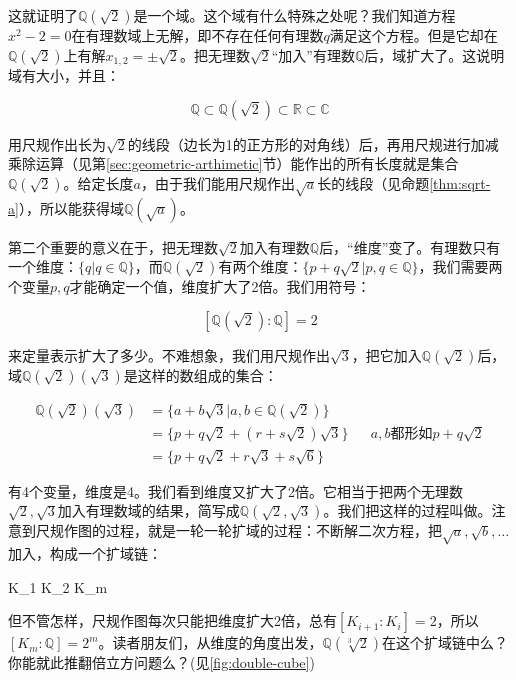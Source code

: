 这就证明了$\mathbb{Q}(\sqrt{2})$是一个域。这个域有什么特殊之处呢？我们知道方程$x^2 - 2 = 0$在有理数域上无解，即不存在任何有理数$q$满足这个方程。但是它却在$\mathbb{Q}(\sqrt{2})$上有解$x_{1, 2} = \pm \sqrt{2}$。把无理数$\sqrt{2}$“加入”有理数$\mathbb{Q}$后，域扩大了。这说明域有大小，并且：

\[
\mathbb{Q} \subset \mathbb{Q}(\sqrt{2}) \subset \mathbb{R} \subset \mathbb{C}
\]

用尺规作出长为$\sqrt{2}$的线段（边长为1的正方形的对角线）后，再用尺规进行加减乘除运算（见第\ref{sec:geometric-arthimetic}节）能作出的所有长度就是集合$\mathbb{Q}(\sqrt{2})$。给定长度$a$，由于我们能用尺规作出$\sqrt{a}$长的线段（见命题\ref{thm:sqrt-a}），所以能获得域$\mathbb{Q}(\sqrt{a})$。

第二个重要的意义在于，把无理数$\sqrt{2}$加入有理数$\mathbb{Q}$后，“维度”变了。有理数只有一个维度：$\{q | q \in \mathbb{Q}\}$，而$\mathbb{Q}(\sqrt{2})$有两个维度：$\{p + q \sqrt{2} | p, q \in \mathbb{Q}\}$，我们需要两个变量$p, q$才能确定一个值，维度扩大了2倍。我们用符号：

\[
[\mathbb{Q}(\sqrt{2}) : \mathbb{Q}] = 2
\]

来定量表示扩大了多少。不难想象，我们用尺规作出$\sqrt{3}$，把它加入$\mathbb{Q}(\sqrt{2})$后，域$\mathbb{Q}(\sqrt{2})(\sqrt{3})$是这样的数组成的集合：

\begin{align*}
  \mathbb{Q}(\sqrt{2})(\sqrt{3}) &= \{a + b \sqrt{3} | a, b \in \mathbb{Q}(\sqrt{2}) \} \\
  &= \{p + q \sqrt{2} + (r + s\sqrt{2})\sqrt{3} \} && a, b \text{都形如} p + q\sqrt{2} \\
  &= \{p + q \sqrt{2} + r\sqrt{3} + s\sqrt{6} \}
\end{align*}

有4个变量，维度是4。我们看到维度又扩大了2倍。它相当于把两个无理数$\sqrt{2}, \sqrt{3}$加入有理数域的结果，简写成$\mathbb{Q}(\sqrt{2}, \sqrt{3})$。我们把这样的过程叫做。注意到尺规作图的过程，就是一轮一轮扩域的过程：不断解二次方程，把$\sqrt{a}, \sqrt{b}, \dotsc$加入，构成一个扩域链：

\be
{} \subset K_1 \subset K_2 \subset \dotsb \subset K_m
\label{eq:tower-of-geometric-field-ext}
\ee

但不管怎样，尺规作图每次只能把维度扩大2倍，总有$[K_{i+1} : K_i] = 2$，所以$[K_m : \mathbb{Q}] = 2^m$。读者朋友们，从维度的角度出发，$\mathbb{Q}(\sqrt[3]{2})$在这个扩域链中么？你能就此推翻倍立方问题么？(见\cref{fig:double-cube})

